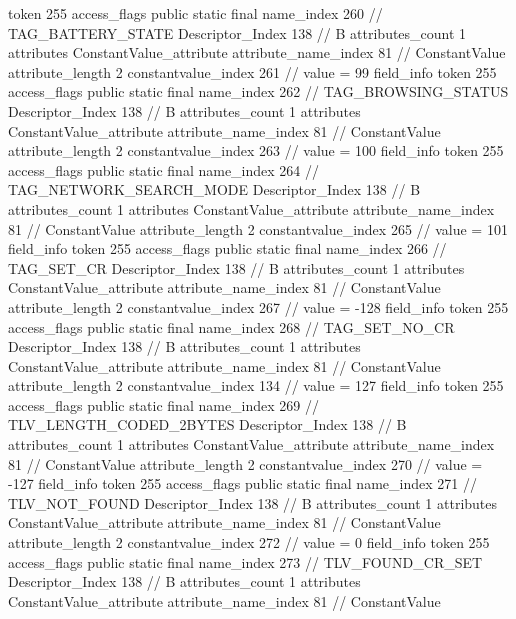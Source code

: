 {{{{{				token	255
				access_flags	public static final
				name_index	260		// TAG_BATTERY_STATE
				Descriptor_Index	138		// B
				attributes_count	1
				attributes {
				ConstantValue_attribute {
					attribute_name_index	81		// ConstantValue
					attribute_length	2
					constantvalue_index	261		// value = 99
				}
				}
			}
			field_info {
				token	255
				access_flags	public static final
				name_index	262		// TAG_BROWSING_STATUS
				Descriptor_Index	138		// B
				attributes_count	1
				attributes {
				ConstantValue_attribute {
					attribute_name_index	81		// ConstantValue
					attribute_length	2
					constantvalue_index	263		// value = 100
				}
				}
			}
			field_info {
				token	255
				access_flags	public static final
				name_index	264		// TAG_NETWORK_SEARCH_MODE
				Descriptor_Index	138		// B
				attributes_count	1
				attributes {
				ConstantValue_attribute {
					attribute_name_index	81		// ConstantValue
					attribute_length	2
					constantvalue_index	265		// value = 101
				}
				}
			}
			field_info {
				token	255
				access_flags	public static final
				name_index	266		// TAG_SET_CR
				Descriptor_Index	138		// B
				attributes_count	1
				attributes {
				ConstantValue_attribute {
					attribute_name_index	81		// ConstantValue
					attribute_length	2
					constantvalue_index	267		// value = -128
				}
				}
			}
			field_info {
				token	255
				access_flags	public static final
				name_index	268		// TAG_SET_NO_CR
				Descriptor_Index	138		// B
				attributes_count	1
				attributes {
				ConstantValue_attribute {
					attribute_name_index	81		// ConstantValue
					attribute_length	2
					constantvalue_index	134		// value = 127
				}
				}
			}
			field_info {
				token	255
				access_flags	public static final
				name_index	269		// TLV_LENGTH_CODED_2BYTES
				Descriptor_Index	138		// B
				attributes_count	1
				attributes {
				ConstantValue_attribute {
					attribute_name_index	81		// ConstantValue
					attribute_length	2
					constantvalue_index	270		// value = -127
				}
				}
			}
			field_info {
				token	255
				access_flags	public static final
				name_index	271		// TLV_NOT_FOUND
				Descriptor_Index	138		// B
				attributes_count	1
				attributes {
				ConstantValue_attribute {
					attribute_name_index	81		// ConstantValue
					attribute_length	2
					constantvalue_index	272		// value = 0
				}
				}
			}
			field_info {
				token	255
				access_flags	public static final
				name_index	273		// TLV_FOUND_CR_SET
				Descriptor_Index	138		// B
				attributes_count	1
				attributes {
				ConstantValue_attribute {
					attribute_name_index	81		// ConstantValue
}}}}}}}
